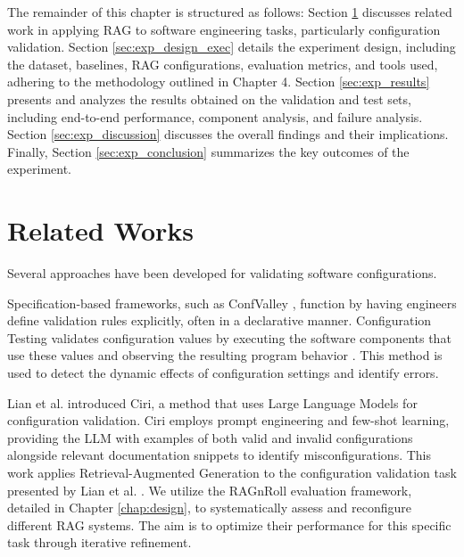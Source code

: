 The remainder of this chapter is structured as follows: Section \ref{sec:related_works_exp} discusses related work in applying RAG to software engineering tasks, particularly configuration validation. Section \ref{sec:exp_design_exec} details the experiment design, including the dataset, baselines, RAG configurations, evaluation metrics, and tools used, adhering to the methodology outlined in Chapter 4. Section \ref{sec:exp_results} presents and analyzes the results obtained on the validation and test sets, including end-to-end performance, component analysis, and failure analysis. Section \ref{sec:exp_discussion} discusses the overall findings and their implications. Finally, Section \ref{sec:exp_conclusion} summarizes the key outcomes of the experiment.

\section{Related Works} \label{sec:related_works_exp}
Several approaches have been developed for validating software configurations.

Specification-based frameworks, such as ConfValley \cite{Huang.2015}, function by having engineers define validation rules explicitly, often in a declarative manner. Configuration Testing validates configuration values by executing the software components that use these values and observing the resulting program behavior \cite{XudongSun.2020}. This method is used to detect the dynamic effects of configuration settings and identify errors.

Lian et al. \cite{Lian.2024} introduced Ciri, a method that uses Large Language Models for configuration validation. Ciri employs prompt engineering and few-shot learning, providing the LLM with examples of both valid and invalid configurations alongside relevant documentation snippets to identify misconfigurations. This work applies Retrieval-Augmented Generation to the configuration validation task presented by Lian et al. \cite{Lian.2024}. We utilize the RAGnRoll evaluation framework, detailed in Chapter \ref{chap:design}, to systematically assess and reconfigure different RAG systems. The aim is to optimize their performance for this specific task through iterative refinement.

